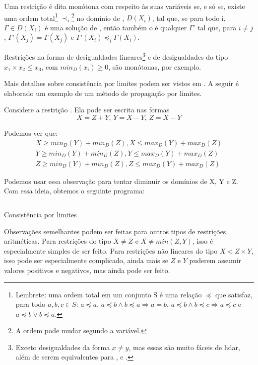 \documentclass{article}
\begin{document}
\begin{definition}
  Uma restrição  é dita monótona com respeito às suas variáveis  se, e só se,
  existe uma ordem total\footnote{Lembrete: uma ordem total em um conjunto S é uma relação $\preceq$ que
    satisfaz, para todo $a, b, c \in S$: $a \preceq a$, $a \preceq b \wedge b \preceq a \Rightarrow
  a = b$, $a\preceq b \wedge b \preceq c \Rightarrow a \preceq c$ e $a\preceq b \vee b\preceq a$.}
    $\prec_i$\footnote{A ordem pode mudar segundo a variável.}
    no domínio de , $D(X_i)$, tal que, se para todo i, $\Gamma \in
  D(X_i)$ é uma solução de , então também o é qualquer $\Gamma$' tal que, para $i \neq
  j$, $\Gamma$'$(X_j) = \Gamma(X_j)$ e $\Gamma$'$(X_i) \preceq_i \Gamma(X_i)$.
\end{definition}

Restrições na forma de desigualdades lineares\footnote{Exceto desigualdades da forma $x \neq y$, mas
essas são muito fáceis de lidar, além de serem equivalentes para \boundd, \boundz{} e \boundr.} e de desigualdades do tipo $x_1 \times x_2 \leq x_3$, com $min_D(x_i) \geq 0$, são
monótonas, por exemplo.

Mais detalhes sobre consistência por limites podem ser vistos em \cite{choi}. A seguir é elaborado um exemplo de um método de propagação por limites.

Considere a restrição . Ela pode ser escrita nas formas
  \[
  X = Z + Y \text{, } Y = X - Y \text{, } Z = X - Y
\]

Podemos ver que:
\begin{gather}
  X \geq min_D(Y)+min_D(Z),  X \leq max_D(Y) + max_D(Z)\\
  Y \geq min_D(Y)+min_D(Z),  Y \leq max_D(Y) + max_D(Z)\\
  Z \geq min_D(Y)+min_D(Z),  Z \leq max_D(Y) + max_D(Z)
\end{gather}

Podemos usar essa observação para tentar diminuir os domínios de X, Y e Z. Com essa ideia, obtemos o seguinte programa:

    \begin{listing}[H]
\inputminted{prolog}{../Exemplos/Cap9/bounds_consistency.pl}
\caption{Consistência por limites}\label{lst:bounds}
    \end{listing}

Observações semelhantes podem ser feitas para outros tipos de restrições aritméticas. Para restrições do tipo $X \neq Z$ e $X  \neq min(Z, Y)$, isso é especialmente simples de ser feito. Para restrições  não lineares do tipo $X < Z\times Y$, isso pode ser
especialmente complicado, ainda mais se $Z$ e $Y$ puderem assumir valores positivos e negativos, mas
ainda pode ser feito.
\end{document}
